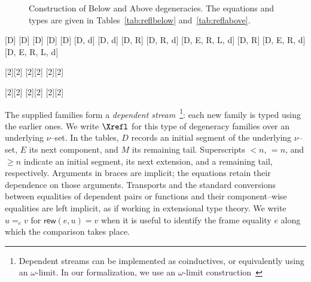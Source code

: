 \documentclass[a4paper,UKenglish,cleveref,autoref]{lipics-v2021}
\newcommand{\fitwidth}[1]{\adjustbox{max width=\linewidth}{#1}}
\newcommand{\linkicon}{\texorpdfstring{\faLink}{🔗}}
\begin{document}
\begin{figure}[tbp]
  \centering
  \fitwidth{}
  \caption{Construction of Below and Above degeneracies. The equations and types are given in Tables~\ref{tab:reflbelow} and~\ref{tab:reflabove}.}
  \label{fig:arch-refl}
\end{figure}

%
[D]
[D]
[D]
[D]
[D]
[D, d]
[D, d]
[D, R]
[D, R, d]
[D, E, R, L, d]
[D, R]
[D, E, R, d]
[D, E, R, L, d]

[2][2]{\X[comp][=#1][#2]}
[2][2]{\X[from][\geq#1][#2]}
[2][2]{\X[to][<#1][#2]}

[2][2]{\Xrefl[comp][=#1][#2]}
[2][2]{\Xrefl[to][<#1][#2]}
[2][2]{\Xrefl[from][\geq#1][#2]}

The supplied families form a \emph{dependent stream}~\footnote{Dependent streams can be implemented as coinductives, or equivalently using an $\omega$-limit. In our formalization, we use an $\omega$-limit construction~\cite{ahrens_et_al15}\href{https://github.com/artagnon/bonak/theories/Lib/Limit.v}{\linkicon}}: each new family is typed using the earlier ones. We write $\Xrefl$ for this type of degeneracy families over an underlying $\nu$--set. In the tables, $D$ records an initial segment of the underlying $\nu$--set, $E$ its next component, and $M$ its remaining tail. Superscripts $<n$, $=n$, and $\geq n$ indicate an initial segment, its next extension, and a remaining tail, respectively. Arguments in braces are implicit; the equations retain their dependence on those arguments. Transports and the standard conversions between equalities of dependent pairs or functions and their component--wise equalities are left implicit, as if working in extensional type theory. We write $u=_e v$ for $\mathsf{rew}(e,u)=v$ when it is useful to identify the frame equality $e$ along which the comparison takes place.
\end{document}

